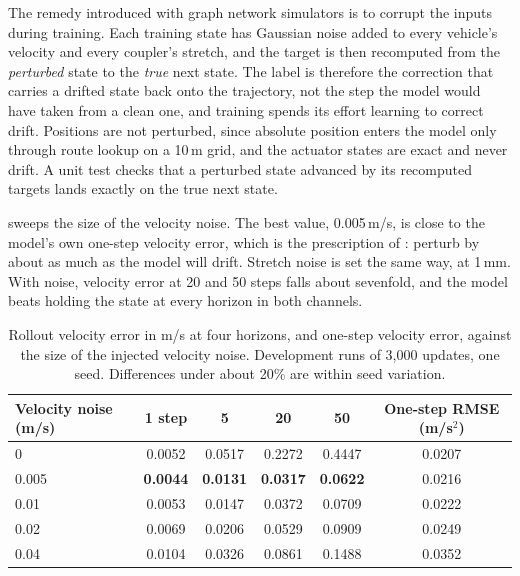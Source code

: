 The remedy introduced with graph network simulators \cite{sanchez2020gns} is to corrupt the inputs during training. Each training state has Gaussian noise added to every vehicle's velocity and every coupler's stretch, and the target is then recomputed from the \emph{perturbed} state to the \emph{true} next state. The label is therefore the correction that carries a drifted state back onto the trajectory, not the step the model would have taken from a clean one, and training spends its effort learning to correct drift. Positions are not perturbed, since absolute position enters the model only through route lookup on a 10\,m grid, and the actuator states are exact and never drift. A unit test checks that a perturbed state advanced by its recomputed targets lands exactly on the true next state.

 sweeps the size of the velocity noise. The best value, 0.005\,m/s, is close to the model's own one-step velocity error, which is the prescription of \cite{sanchez2020gns}: perturb by about as much as the model will drift. Stretch noise is set the same way, at 1\,mm. With noise, velocity error at 20 and 50 steps falls about sevenfold, and the model beats holding the state at every horizon in both channels.

\begin{table}[htbp]
    \centering
    \begin{tabular}{lccccc}
        \toprule
        Velocity noise (m/s) & 1 step & 5 & 20 & 50 & One-step RMSE (m/s$^2$) \\
        \midrule
        0     & 0.0052 & 0.0517 & 0.2272 & 0.4447 & 0.0207 \\
        0.005 & \textbf{0.0044} & \textbf{0.0131} & \textbf{0.0317} & \textbf{0.0622} & 0.0216 \\
        0.01  & 0.0053 & 0.0147 & 0.0372 & 0.0709 & 0.0222 \\
        0.02  & 0.0069 & 0.0206 & 0.0529 & 0.0909 & 0.0249 \\
        0.04  & 0.0104 & 0.0326 & 0.0861 & 0.1488 & 0.0352 \\
        \bottomrule
    \end{tabular}
    \caption{Rollout velocity error in m/s at four horizons, and one-step velocity error, against the size of the injected velocity noise. Development runs of 3,000 updates, one seed. Differences under about 20\% are within seed variation.}
    \label{tab:train_noise_sweep}
\end{table}

